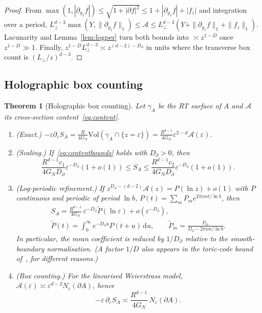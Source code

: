 \documentclass[11pt]{article}
\newtheorem{theorem}{Theorem}
\theoremstyle{definition}\newtheorem{definition}{Definition}[section]
\theoremstyle{remark}\newtheorem*{remark}{Remark}
\newcommand{\cA}{\mathcal{A}}
\newcommand{\dd}{\mathrm{d}}
\newcommand{\Vol}{\mathrm{Vol}}
\newcommand{\GN}{G_N}
\begin{document}
\begin{proof}
From $\max(1,|\partial_{y_1}f|)\le\sqrt{1+|\partial f|^2}\le1+|\partial_{y_1}f|+|f_z|$ and integration over a
period,
$L_\perp^{d-3}\max(Y,\|\partial_{y_1}f\|_1)\le\cA\le L_\perp^{d-3}(Y+\|\partial_{y_1}f\|_1+\|f_z\|_1)$.
Lacunarity and Lemma~\ref{lem:logper} turn both bounds into $\asymp z^{1-D}$ once $z^{1-D}\gg1$. Finally,
$z^{1-D}L_\perp^{d-3}\asymp z^{(d-2)-D_\partial}$ in units where the transverse box count is
$(L_\perp/z)^{d-3}$.
\end{proof}

\subsection{Holographic box counting}
\begin{theorem}[Holographic box counting]
\label{thm:box}
Let $\gamma_A$ be the RT surface of $A$ and $\cA$ its cross-section content~\eqref{eq:content}.
\begin{enumerate}
\item[(i)] (Exact.) $-\varepsilon\partial_\varepsilon S_A=\frac{R}{4\GN}\Vol(\gamma_A\cap\{z=\varepsilon\})=\frac{R^{d-1}}{4\GN}\varepsilon^{2-d}\cA(\varepsilon)$.
\item[(ii)] (Scaling.) If~\eqref{eq:contentbounds} holds with $D_\partial>0$, then
\begin{equation}
\frac{R^{d-1}c_1}{4\GN D_\partial}\varepsilon^{-D_\partial}(1+o(1))\le S_A\le\frac{R^{d-1}c_2}{4\GN D_\partial}\varepsilon^{-D_\partial}(1+o(1)).
\end{equation}
\item[(iii)] (Log-periodic refinement.) If $z^{D_\partial-(d-2)}\cA(z)=P(\ln z)+o(1)$ with $P$ continuous and
periodic of period $\ln b$, $P(t)=\sum_mP_me^{2\pi imt/\ln b}$, then
\begin{equation}
\begin{gathered}
S_A=\frac{R^{d-1}}{4\GN}\,\varepsilon^{-D_\partial}\tilde P(\ln\varepsilon)+o(\varepsilon^{-D_\partial}),\\
\tilde P(t)=\int_0^\infty e^{-D_\partial u}P(t+u)\,\dd u,\qquad \tilde P_m=\frac{P_m}{D_\partial-2\pi im/\ln b}.
\end{gathered}
\label{eq:Ptilde}
\end{equation}
In particular, the mean coefficient is reduced by $1/D_\partial$ relative to the smooth-boundary normalisation.
(A factor $1/D$ also appears in the toric-code bound of~\cite{Hamma}, for different reasons.)
\item[(iv)] (Box counting.) For the linearised Weierstrass model, $\cA(\varepsilon)\asymp\varepsilon^{d-2}N_\varepsilon(\partial A)$, hence
\begin{equation}
-\varepsilon\,\partial_\varepsilon S_A\asymp\frac{R^{d-1}}{4\GN}\,N_\varepsilon(\partial A).
\label{eq:boxcount}
\end{equation}
\end{enumerate}
\end{theorem}
\end{document}
